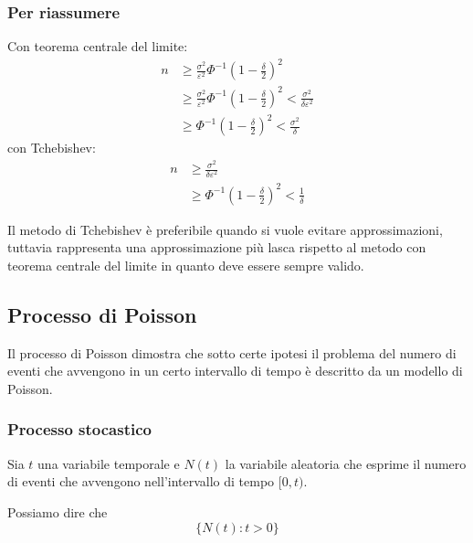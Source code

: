 \subsubsection*{Per riassumere}
Con teorema centrale del limite: 
\begin{align*}
n 	& \geq \frac{\sigma^2}{\varepsilon^2} \Phi^{-1}(1-\frac{\delta}{2})^2 \\
 	& \geq \frac{\sigma^2}{\varepsilon^2} \Phi^{-1} (1-\frac{\delta}{2})^2 < \frac{\sigma^2}{\delta \varepsilon^2}\\
	& \geq \Phi^{-1} (1-\frac{\delta}{2})^2 < \frac{\sigma^2}{\delta}
\end{align*}
con Tchebishev:
\begin{align*}
	n & \geq \frac{\sigma^2}{\delta \varepsilon^2}\\
	 & \geq \Phi^{-1} ( 1 - \frac{\delta}{2})^2 < \frac{1}{\delta}
\end{align*}

Il metodo di Tchebishev è preferibile quando si vuole evitare approssimazioni, tuttavia rappresenta una approssimazione più lasca rispetto al metodo con teorema centrale del limite in quanto deve essere sempre valido.


\subsection{Processo di Poisson}
Il processo di Poisson dimostra che sotto certe ipotesi il problema del numero di eventi che avvengono in un certo intervallo di tempo è descritto da un modello di Poisson.

\subsubsection{Processo stocastico}
\begin{teor}
	Sia $t$ una variabile temporale e $N(t)$ la variabile aleatoria che esprime il numero di eventi che avvengono nell'intervallo di tempo $[0,t)$. 
	\end{teor}
Possiamo dire che \begin{equation*}
	\{N(t): t > 0\} 
	\end{equation*}
	
